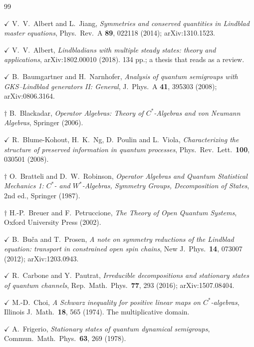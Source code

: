 \documentclass[11pt]{article}
\theoremstyle{plain}
\theoremstyle{remark}
\begin{document}
\begin{thebibliography}{99}

 $\checkmark$ V.~V.~Albert and L.~Jiang,
  \emph{Symmetries and conserved quantities in Lindblad master equations},
  Phys.\ Rev.\ A \textbf{89}, 022118 (2014); arXiv:1310.1523.

 $\checkmark$ V.~V.~Albert,
  \emph{Lindbladians with multiple steady states: theory and applications},
  arXiv:1802.00010 (2018). 134 pp.; a thesis that reads as a review.

 $\checkmark$ B.~Baumgartner and H.~Narnhofer,
  \emph{Analysis of quantum semigroups with GKS--Lindblad generators II:
  General},
  J.\ Phys.\ A \textbf{41}, 395303 (2008); arXiv:0806.3164.

 $\dagger$ B.~Blackadar,
  \emph{Operator Algebras: Theory of $C^*$-Algebras and von Neumann Algebras},
  Springer (2006).

 $\checkmark$ R.~Blume-Kohout, H.~K.~Ng, D.~Poulin and
  L.~Viola,
  \emph{Characterizing the structure of preserved information in quantum
  processes},
  Phys.\ Rev.\ Lett.\ \textbf{100}, 030501 (2008).

 $\dagger$ O.~Bratteli and D.~W.~Robinson,
  \emph{Operator Algebras and Quantum Statistical Mechanics 1: $C^*$- and
  $W^*$-Algebras, Symmetry Groups, Decomposition of States},
  2nd ed., Springer (1987).

 $\dagger$ H.-P.~Breuer and F.~Petruccione,
  \emph{The Theory of Open Quantum Systems}, Oxford University Press (2002).

 $\checkmark$ B.~Bu\v{c}a and T.~Prosen,
  \emph{A note on symmetry reductions of the Lindblad equation: transport in
  constrained open spin chains},
  New J.\ Phys.\ \textbf{14}, 073007 (2012); arXiv:1203.0943.

 $\checkmark$ R.~Carbone and Y.~Pautrat,
  \emph{Irreducible decompositions and stationary states of quantum channels},
  Rep.\ Math.\ Phys.\ \textbf{77}, 293 (2016); arXiv:1507.08404.

 $\checkmark$ M.-D.~Choi,
  \emph{A Schwarz inequality for positive linear maps on $C^*$-algebras},
  Illinois J.\ Math.\ \textbf{18}, 565 (1974). The multiplicative domain.

 $\checkmark$ A.~Frigerio,
  \emph{Stationary states of quantum dynamical semigroups},
  Commun.\ Math.\ Phys.\ \textbf{63}, 269 (1978).


\end{thebibliography}
\end{document}
